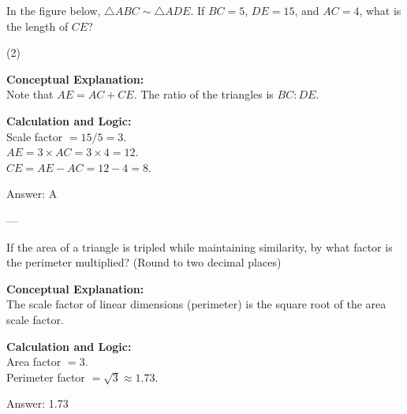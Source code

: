 \documentclass[11pt,paper=a4,answers]{exam}
\begin{document}
\begin{questions}
\question
In the figure below, $\triangle ABC \sim \triangle ADE$. If $BC = 5$, $DE = 15$, and $AC = 4$, what is the length of $CE$?
\begin{center}
\end{center}
\begin{tasks}(2)
\end{tasks}

\begin{solution}
\textbf{Conceptual Explanation:} \\
Note that $AE = AC + CE$. The ratio of the triangles is $BC:DE$.

\vspace{10pt}
\textbf{Calculation and Logic:} \\
Scale factor $= 15/5 = 3$. \\
$AE = 3 \times AC = 3 \times 4 = 12$. \\
$CE = AE - AC = 12 - 4 = 8$.

\vspace{15pt}
Answer: \colorbox{yellow!100}{A}
\end{solution}

---

\question
If the area of a triangle is tripled while maintaining similarity, by what factor is the perimeter multiplied? (Round to two decimal places)

\begin{solution}
\textbf{Conceptual Explanation:} \\
The scale factor of linear dimensions (perimeter) is the square root of the area scale factor.

\vspace{10pt}
\textbf{Calculation and Logic:} \\
Area factor $= 3$. \\
Perimeter factor $= \sqrt{3} \approx 1.73$.

\vspace{15pt}
Answer: \colorbox{yellow!100}{1.73}
\end{solution}


\end{questions}
\end{document}
